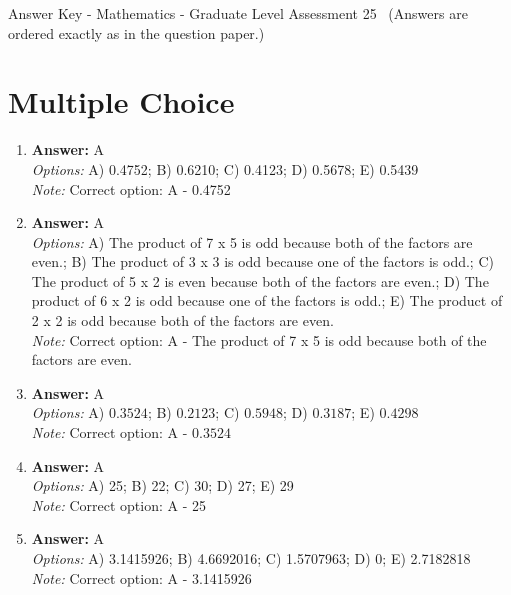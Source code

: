 \documentclass[12pt]{article}
\begin{document}
\begin{center}
Answer Key - Mathematics - Graduate Level Assessment 25 \
\small (Answers are ordered exactly as in the question paper.)
\end{center}

\section*{Multiple Choice}
\begin{enumerate}[label=\arabic*.]
\item \textbf{Answer:} A
\\ \textit{Options:} A) 0.4752; B) 0.6210; C) 0.4123; D) 0.5678; E) 0.5439
\\ \textit{Note:} Correct option: A - 0.4752
\item \textbf{Answer:} A
\\ \textit{Options:} A) The product of 7 x 5 is odd because both of the factors are even.; B) The product of 3 x 3 is odd because one of the factors is odd.; C) The product of 5 x 2 is even because both of the factors are even.; D) The product of 6 x 2 is odd because one of the factors is odd.; E) The product of 2 x 2 is odd because both of the factors are even.
\\ \textit{Note:} Correct option: A - The product of 7 x 5 is odd because both of the factors are even.
\item \textbf{Answer:} A
\\ \textit{Options:} A) $0.3524$; B) $0.2123$; C) $0.5948$; D) $0.3187$; E) $0.4298$
\\ \textit{Note:} Correct option: A - $0.3524$
\item \textbf{Answer:} A
\\ \textit{Options:} A) 25; B) 22; C) 30; D) 27; E) 29
\\ \textit{Note:} Correct option: A - 25
\item \textbf{Answer:} A
\\ \textit{Options:} A) 3.1415926; B) 4.6692016; C) 1.5707963; D) 0; E) 2.7182818
\\ \textit{Note:} Correct option: A - 3.1415926
\end{enumerate}
\end{document}
